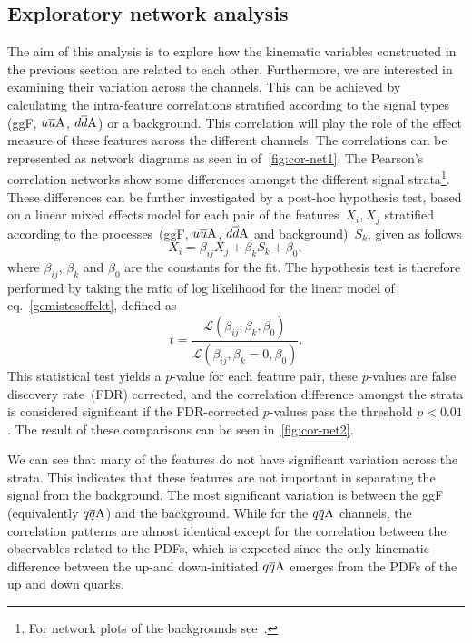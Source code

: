 \subsection{ Exploratory network analysis}
\par The aim of this analysis is to explore how the kinematic variables constructed in the previous section are related to each other. Furthermore, we are interested in examining their variation across the channels.  This can be achieved by calculating the intra-feature correlations stratified according to the signal types (ggF, $u\overline u \rm A$, $d\overline d \rm A$) or a background. This correlation will play the role of the effect measure of these features across the different channels. The correlations can  be represented as network diagrams as seen in of~\autoref{fig:cor-net1}. The Pearson's correlation networks show some differences amongst the different signal strata\footnote{For network plots of the backgrounds see~\cite{Grojean:2020ech}.}. These differences can be further investigated by a post-hoc hypothesis test, based on a linear mixed effects model for each pair of the features~$X_i, X_j$ stratified according to the processes~(ggF, $u\overline u \rm A$, $d\overline d \rm A$ and background)~$S_k$, given as follows
\begin{equation}
	X_i = \beta_{ij} X_j + \beta_k S_k + \beta_0,
	\label{gemisteseffekt}
\end{equation}
where $\beta_{ij}$, $\beta_k$ and $\beta_0$ are the constants for the fit. The hypothesis test is therefore performed by taking  the ratio of log likelihood for the linear model of eq.~\eqref{gemisteseffekt}, defined as
\begin{equation}
	t = \frac{\mathscr{L} (\beta_{ij},\beta_k,\beta_0) }{\mathscr{L}(\beta_{ij},\beta_k=0,\beta_0)}.
\end{equation}
This statistical test yields a $p$-value for each feature pair, these $p$-values are false discovery rate~(FDR) corrected, and the correlation difference amongst the strata is considered significant if the FDR-corrected $p$-values pass the threshold $p<0.01$. The result of these comparisons can be seen in~\autoref{fig:cor-net2}. 
\par We can see that many of the features do not have significant variation across the strata. This indicates that these features are not important in separating the signal from the background. The most significant variation is between the ggF (equivalently $q\overline q \rm A$) and the background. While for the $q\overline q \rm A$ channels, the correlation patterns are almost identical except for the correlation between the observables related to the PDFs, which is expected since the only kinematic difference between the up-and down-initiated $q\overline q \rm A$ emerges from the PDFs of the up and down quarks. 
